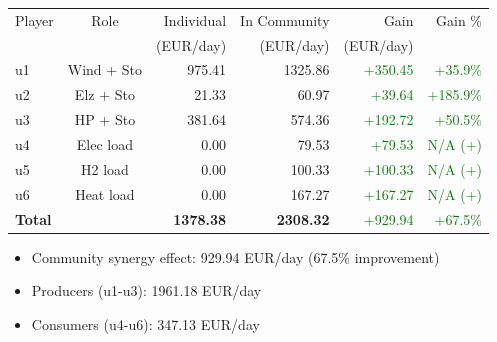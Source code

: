 \begin{frame}
    \begin{table}[h]
    \centering
    \small
    \begin{tabular}{l|c|r|r|r|r}
    \toprule
    Player & Role & Individual & In Community & Gain & Gain \% \\
        &      & (EUR/day) & (EUR/day) & (EUR/day) & \\
    \midrule
    u1 & Wind + Sto & 975.41 & 1325.86 & \textcolor{green}{+350.45} & \textcolor{green}{+35.9\%} \\
u2 & Elz + Sto & 21.33 & 60.97 & \textcolor{green}{+39.64} & \textcolor{green}{+185.9\%} \\
u3 & HP + Sto & 381.64 & 574.36 & \textcolor{green}{+192.72} & \textcolor{green}{+50.5\%} \\
u4 & Elec load & 0.00 & 79.53 & \textcolor{green}{+79.53} & \textcolor{green}{N/A (+)} \\
u5 & H2 load & 0.00 & 100.33 & \textcolor{green}{+100.33} & \textcolor{green}{N/A (+)} \\
u6 & Heat load & 0.00 & 167.27 & \textcolor{green}{+167.27} & \textcolor{green}{N/A (+)} \\
\midrule
    \textbf{Total} & & \textbf{1378.38} & \textbf{2308.32} & \textcolor{green}{+929.94} & \textcolor{green}{+67.5\%} \\
    \bottomrule
    \end{tabular}
    \end{table}

    \vspace{0.5em}
    \begin{itemize}
    \item Community synergy effect: 929.94 EUR/day (67.5\% improvement)
    \item Producers (u1-u3): 1961.18 EUR/day
    \item Consumers (u4-u6): 347.13 EUR/day
    \end{itemize}
    \end{frame}